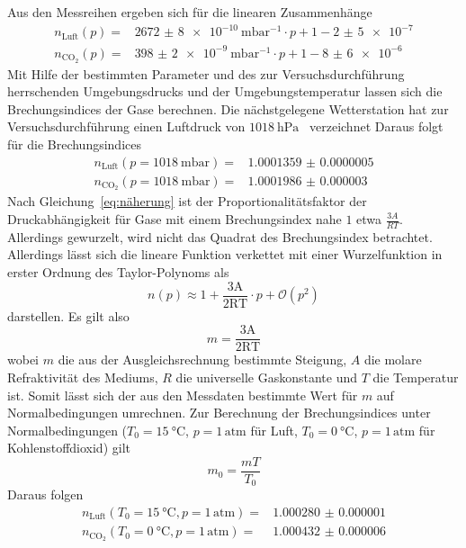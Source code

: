 Aus den Messreihen ergeben sich für die linearen Zusammenhänge
%
\begin{align}
  n_{\text{Luft}}(p)=&\SI{2672(8)e-10}{\milli\bar^{-1}}
  \cdot p+1-\num{2(5)e-7} \\
  n_{\text{CO}_2}(p)=&\SI{398(2)e-9}{\milli\bar^{-1}}
  \cdot p+1-\num{8(6)e-6}
\end{align}
%
Mit Hilfe der bestimmten Parameter und des zur Versuchsdurchführung herrschenden
Umgebungsdrucks und der Umgebungstemperatur lassen sich die Brechungsindices der
Gase berechnen. Die nächstgelegene Wetterstation hat zur Versuchsdurchführung
einen Luftdruck von $\SI{1018}{\hecto\pascal}$~\cite{wetteronline} verzeichnet
Daraus folgt für die Brechungsindices
%
\begin{align}
  n_{\text{Luft}}(p=\SI{1018}{\milli\bar})=&\num{1.0001359(5)} \\
  n_{\text{CO}_2}(p=\SI{1018}{\milli\bar})=&\num{1.0001986(30)}
\end{align}
%
Nach Gleichung~\eqref{eq:näherung} ist der Proportionalitätsfaktor
der Druckabhängigkeit für Gase mit einem Brechungsindex nahe $1$ etwa
$\frac{3A}{RT}$. Allerdings gewurzelt, wird nicht das Quadrat des
Brechungsindex betrachtet. Allerdings lässt sich die lineare Funktion verkettet
mit einer Wurzelfunktion in erster Ordnung des Taylor-Polynoms als
%
\begin{equation*}
  n(p)\approx1+\frac{3\mathup{A}}{2\mathup{RT}}\cdot p + \mathcal{O}(p^2)
\end{equation*}
%
darstellen. Es gilt also
%
\begin{equation}
  m=\frac{3\mathup{A}}{2\mathup{RT}}
\end{equation}
%
wobei $m$ die aus der Ausgleichsrechnung bestimmte Steigung, $A$ die molare
Refraktivität des Mediums, $R$ die universelle Gaskonstante und $T$ die
Temperatur ist. Somit lässt sich der aus den Messdaten bestimmte Wert für $m$
auf Normalbedingungen umrechnen. Zur Berechnung der Brechungsindices unter
Normalbedingungen ($T_0=\SI{15}{\celsius}$, $p=1\,\text{atm}$ für Luft,
$T_0=\SI{0}{\celsius}$, $p=1\,\text{atm}$ für Kohlenstoffdioxid) gilt
%
\begin{equation}
  m_0=\frac{mT}{T_0}
\end{equation}
%
Daraus folgen
%
\begin{align}
  n_{\text{Luft}}(T_0=\SI{15}{\celsius}, p=1\,\text{atm})=&\num{1.000280(1)} \\
  n_{\text{CO}_2}(T_0=\SI{0}{\celsius}, p=1\,\text{atm})=&\num{1.000432(6)}
\end{align}

